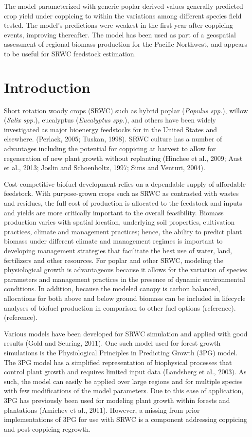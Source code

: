 \documentclass[10pt]{article}
\begin{document}
The model parameterized with generic poplar derived values generally predicted
crop yield under coppicing to within the variations among different species
field tested.  The model's predictions were weakest in the first year after
coppicing events, improving thereafter. The model has been used as part of a
geospatial assessment of regional biomass production for the Pacific Northwest,
and appears to be useful for SRWC feedstock estimation.

\section*{Introduction}

Short rotation woody crops (SRWC) such as hybrid poplar (\textit{Populus spp.}),
willow (\textit{Salix spp.}), eucalyptus (\textit{Eucalyptus spp.}), and others have
been widely investigated as major bioenergy feedstocks for in the United States
and elsewhere.  (Perlack, 2005; Tuskan, 1998). SRWC culture has a number of
advantages including the potential for coppicing at harvest to allow for
regeneration of new plant growth without replanting (Hinchee et al., 2009; Aust
et al., 2013; Joslin and Schoenholtz, 1997; Sims and Venturi, 2004).

Cost-competitive biofuel development relies on a dependable supply of affordable
feedstock.  With purpose-grown crops such as SRWC as contrasted with wastes and
residues, the full cost of production is allocated to the feedstock and inputs
and yields are more critically important to the overall feasibility.  Biomass
production varies with spatial location, underlying soil properties, cultivation
practices, climate and management practices; hence, the ability to predict plant
biomass under different climate and management regimes is important to
developing management strategies that facilitate the best use of water, land,
fertilizers and other resources. For poplar and other SRWC, modeling the
physiological growth is advantageous because it allows for the variation of
species parameters and management practices in the presence of dynamic
environmental conditions. In addition, because the modeled canopy is carbon
balanced, allocations for both above and below ground biomass can be included in
lifecycle analyses of biofuel production in comparison to other fuel options
(reference). (reference).

Various models have been developed for SRWC simulation and applied with good
results (Gold and Seuring, 2011). One such model used for forest growth
simulations is the Physiological Principles in Predicting Growth (3PG)
model. The 3PG model has a simplified representation of biophysical processes
that control plant growth and requires limited input data (Landsberg et al.,
2003). As such, the model can easily be applied over large regions and for
multiple species with few modifications of the model parameters. Due to this
ease of application, 3PG has previously been used for modeling plant growth
within forests and plantations (Amichev et al., 2011). However, a missing from
prior implementations of 3PG for use with SRWC is a component addressing
coppicing and post-coppicing regrowth.
\end{document}
